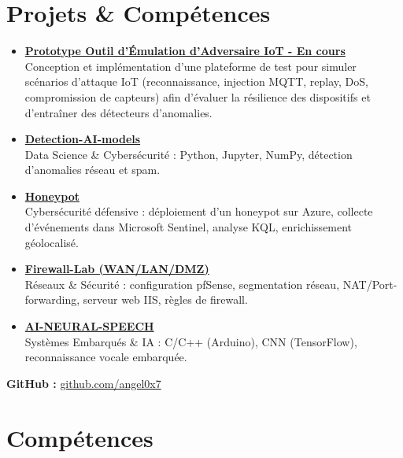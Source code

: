 \documentclass[a4paper,10pt]{article}
\begin{document}
\section*{Projets \& Compétences}


\begin{itemize}[leftmargin=*]


\item \href{https://github.com/angel0x7/IoT-Adversary-Emulator}{\textbf{Prototype Outil d'Émulation d'Adversaire IoT - En cours}} \\
Conception et implémentation d'une plateforme de test pour simuler scénarios d'attaque IoT (reconnaissance, injection MQTT, replay, DoS, compromission de capteurs) afin d'évaluer la résilience des dispositifs et d'entraîner des détecteurs d'anomalies.

  \item \href{https://github.com/angel0x7/Detection-AI-models-}{\textbf{Detection-AI-models}} \\
  Data Science \& Cybersécurité : Python, Jupyter, NumPy, détection d’anomalies réseau et spam.

  \item \href{https://github.com/angel0x7/Honeypot-}{\textbf{Honeypot}} \\
  Cybersécurité défensive : déploiement d’un honeypot sur Azure, collecte d’événements dans Microsoft Sentinel, analyse KQL, enrichissement géolocalisé.

  \item \href{https://github.com/angel0x7/Firewall-Lab-WAN-LAN-DMZ-}{\textbf{Firewall-Lab (WAN/LAN/DMZ)}} \\
  Réseaux \& Sécurité : configuration pfSense, segmentation réseau, NAT/Port-forwarding, serveur web IIS, règles de firewall.

  \item \href{https://github.com/angel0x7/AI-NEURAL-SPEECH-}{\textbf{AI-NEURAL-SPEECH}} \\
  Systèmes Embarqués \& IA : C/C++ (Arduino), CNN (TensorFlow), reconnaissance vocale embarquée.


\end{itemize}

\noindent
\textbf{GitHub :} \href{https://github.com/angel0x7}{github.com/angel0x7}


\section*{Compétences}
\end{document}
